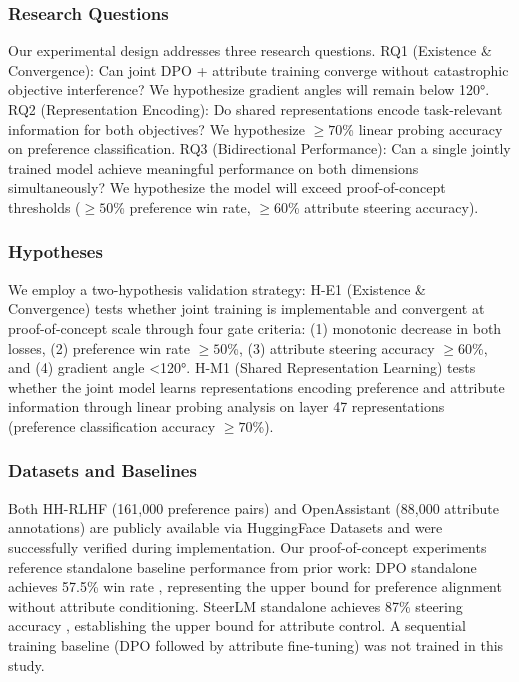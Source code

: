 
\subsubsection{Research Questions}

Our experimental design addresses three research questions. RQ1 (Existence \& Convergence): Can joint DPO + attribute training converge without catastrophic objective interference? We hypothesize gradient angles will remain below 120°. RQ2 (Representation Encoding): Do shared representations encode task-relevant information for both objectives? We hypothesize $\geq 70$\% linear probing accuracy on preference classification. RQ3 (Bidirectional Performance): Can a single jointly trained model achieve meaningful performance on both dimensions simultaneously? We hypothesize the model will exceed proof-of-concept thresholds ($\geq 50$\% preference win rate, $\geq 60$\% attribute steering accuracy).

\subsubsection{Hypotheses}

We employ a two-hypothesis validation strategy: H-E1 (Existence \& Convergence) tests whether joint training is implementable and convergent at proof-of-concept scale through four gate criteria: (1) monotonic decrease in both losses, (2) preference win rate $\geq 50$\%, (3) attribute steering accuracy $\geq 60$\%, and (4) gradient angle <120°. H-M1 (Shared Representation Learning) tests whether the joint model learns representations encoding preference and attribute information through linear probing analysis on layer 47 representations (preference classification accuracy $\geq 70$\%).

\subsubsection{Datasets and Baselines}

Both HH-RLHF (161,000 preference pairs) and OpenAssistant (88,000 attribute annotations) are publicly available via HuggingFace Datasets and were successfully verified during implementation. Our proof-of-concept experiments reference standalone baseline performance from prior work: DPO standalone achieves 57.5\% win rate \citep{Rafailov2023DPO}, representing the upper bound for preference alignment without attribute conditioning. SteerLM standalone achieves 87\% steering accuracy \citep{Dong2023SteerLM}, establishing the upper bound for attribute control. A sequential training baseline (DPO followed by attribute fine-tuning) was not trained in this study.

